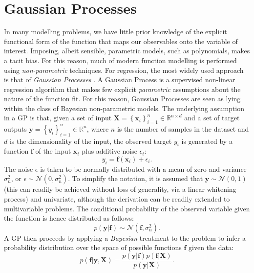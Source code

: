 \documentclass[useAMS,usenatbib,fleqn]{mn2e}
\begin{document}
\section{Gaussian Processes}
\label{sec-gaussian-process}
In many modelling problems, we have little prior knowledge of the explicit functional form of the function that maps our observables onto the variable of interest. Imposing, albeit sensible, parametric models, such as polynomials, makes a tacit bias. For this reason, much of modern function modelling is performed using \emph{non-parametric} techniques. For regression, the most widely used approach is that of \emph{Gaussian Processes} \citep{rasmussen2006gaussian}.
A Gaussian Process is a supervised non-linear regression algorithm that makes few explicit \emph{parametric} assumptions about the nature of the function fit. For this reason, Gaussian Processes are seen as lying within the class of Bayesian non-parametric models. The underlying assumption in a GP is that, given a set of input $\mathbf{X}=\left\{\mathbf{x}_{i}\right\}_{i=1}^{n}\in \mathbb{R}^{n\times d}$ and a set of target outputs $\mathbf{y}=\left\{y_{i}\right\}_{i=1}^{n}\in \mathbb{R}^{n}$, where $n$ is the number of samples in the dataset and $d$ is the dimensionality of the input, the observed target $y_{i}$ is generated by a function $\mathbf{f}$ of the input $\mathbf{x}_{i}$ plus additive noise $\epsilon_{i}$:
\begin{equation}
y_{i} = \mathbf{f}\left(\mathbf{x}_{i}\right)+\epsilon_{i}.
\end{equation}
The noise $\epsilon$ is taken to be normally distributed with a mean of zero and variance $\sigma_{n}^{2}$, or $\epsilon\sim\mathcal{N} \left(0,\sigma_{n}^{2}\right)$. To simplify the notation, it is assumed that $\mathbf{y}\sim\mathcal{N} \left(0,1\right)$ (this can readily be achieved without loss of generality, via a linear whitening process) and univariate, although the derivation can be readily extended to multivariable problems. The conditional probability of the observed variable given the function is hence distributed as follows:
\begin{equation}
p\left(\mathbf{y}|\mathbf{f}\right)\sim\mathcal{N} \left(\mathbf{f},\sigma_{n}^{2}\right).
\end{equation}
A GP then proceeds by applying a \emph{Bayesian} treatment to the problem to infer a probability distribution over the space of possible functions $\mathbf{f}$ given the data:
\begin{equation}
p\left(\mathbf{f}|\mathbf{y},\mathbf{X}\right) = \frac{p\left(\mathbf{y}|\mathbf{f}\right)p\left(\mathbf{f}|\mathbf{X}\right)}{p\left(\mathbf{y}|\mathbf{X}\right)}.
\end{equation}
\end{document}
